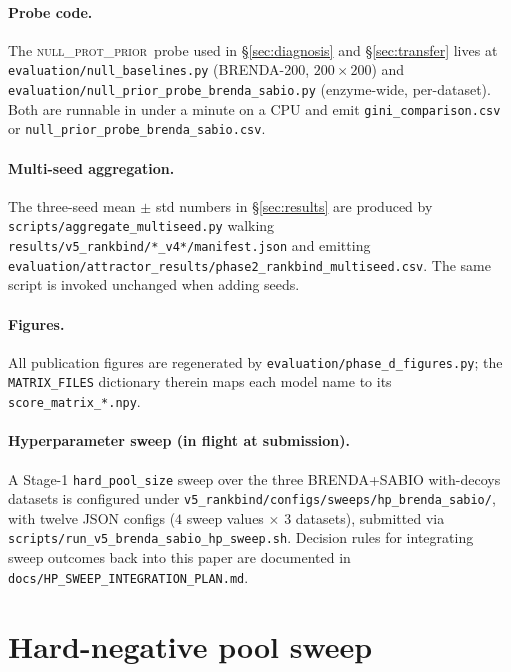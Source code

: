 \documentclass[11pt,a4paper]{article}
\newcommand{\nullprior}{\textsc{null\_prot\_prior}\xspace}
\begin{document}
\paragraph{Probe code.}
The \nullprior\ probe used in \S\ref{sec:diagnosis} and
\S\ref{sec:transfer} lives at \texttt{evaluation/null\_baselines.py}
(BRENDA-200, $200 \times 200$) and
\texttt{evaluation/null\_prior\_probe\_brenda\_sabio.py} (enzyme-wide,
per-dataset). Both are runnable in under a minute on a CPU and emit
\texttt{gini\_comparison.csv} or
\texttt{null\_prior\_probe\_brenda\_sabio.csv}.

\paragraph{Multi-seed aggregation.}
The three-seed mean $\pm$ std numbers in \S\ref{sec:results} are
produced by \texttt{scripts/aggregate\_multiseed.py} walking
\texttt{results/v5\_rankbind/*\_v4*/manifest.json} and emitting
\texttt{evaluation/attractor\_results/phase2\_rankbind\_multiseed.csv}.
The same script is invoked unchanged when adding seeds.

\paragraph{Figures.}
All publication figures are regenerated by
\texttt{evaluation/phase\_d\_figures.py}; the \texttt{MATRIX\_FILES}
dictionary therein maps each model name to its
\texttt{score\_matrix\_*.npy}.

\paragraph{Hyperparameter sweep (in flight at submission).}
A Stage-1 \texttt{hard\_pool\_size} sweep over the three
BRENDA+SABIO with-decoys datasets is configured under
\texttt{v5\_rankbind/configs/sweeps/hp\_brenda\_sabio/}, with twelve
JSON configs ($4$ sweep values $\times$ $3$ datasets), submitted via
\texttt{scripts/run\_v5\_brenda\_sabio\_hp\_sweep.sh}. Decision rules
for integrating sweep outcomes back into this paper are documented in
\texttt{docs/HP\_SWEEP\_INTEGRATION\_PLAN.md}.

\section{Hard-negative pool sweep}
\label{sec:hpsweep}
\end{document}
